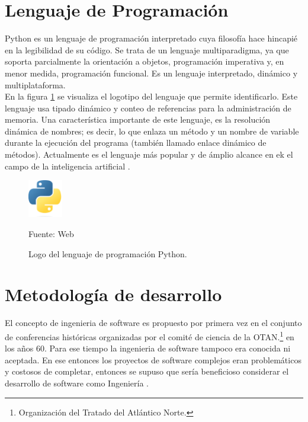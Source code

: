 \section{Lenguaje de Programación}
Python es un lenguaje de programación interpretado cuya filosofía hace hincapié en la legibilidad de su código. Se trata de un lenguaje multiparadigma, ya que soporta parcialmente la orientación a objetos, programación imperativa y, en menor medida, programación funcional. Es un lenguaje interpretado, dinámico y multiplataforma.\\

En la figura \ref{fig:python} se visualiza el logotipo del lenguaje que permite identificarlo. Este lenguaje usa tipado dinámico y conteo de referencias para la administración de memoria. Una característica importante de este lenguaje, es la resolución dinámica de nombres; es decir, lo que enlaza un método y un nombre de variable durante la ejecución del programa (también llamado enlace dinámico de métodos). Actualmente es el lenguaje más popular y de ámplio alcance en ek el campo de la inteligencia artificial \cite{python:popular}.\\

\begin{figure}[H]
    \begin{center}
        \includegraphics[width=1.5cm]{img/capitulo_2/python.png}
    \end{center}
    \begin{center}
        \caption{Logo del lenguaje de programación Python.}
        Fuente: Web
        \label{fig:python}
    \end{center}
\end{figure}


\section{Metodología de desarrollo}
El concepto de ingenieria de software es propuesto por primera vez en el conjunto de conferencias históricas organizadas por el comité de ciencia de la OTAN.\footnote{Organización del Tratado del Atlántico Norte.} en los años 60. Para ese tiempo la ingenieria de software tampoco era conocida ni aceptada. En ese entonces los proyectos de software complejos eran problemáticos y costosos de completar, entonces se supuso que sería beneficioso considerar el desarrollo de software como Ingeniería \cite{Ganis}.\\

